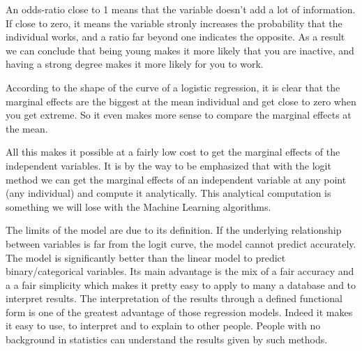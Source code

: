 






An odds-ratio close to 1 means that the variable doesn’t add a lot of information. If close to zero, it means the variable stronly increases the probability that the individual works, and a ratio far beyond one indicates the opposite.
As a result we can conclude that being young makes it more likely that you are inactive, and having a strong degree makes it more likely for you to work.

According to the shape of the curve of a logistic regression, it is clear that the marginal effects are the biggest at the mean individual and get close to zero when you get extreme. So it even makes more sense to compare the marginal effects at the mean.

All this makes it possible at a fairly low cost to get the marginal effects of the independent variables. It is by the way to be emphasized that with the logit method we can get the marginal effects of an independent variable at any point (any individual) and compute it analytically.
This analytical computation is something we will lose with the Machine Learning algorithms.

The limits of the model are due to its definition. If the underlying relationship between variables is far from the logit curve, the model cannot predict accurately. The model is significantly better than the linear model to predict binary/categorical variables.
Its main advantage is the mix of a fair accuracy and a a fair simplicity which makes it pretty easy to apply to many a database and to interpret results.
The interpretation of the results through a defined functional form is one of the greatest advantage of those regression models. Indeed it makes it easy to use, to interpret and to explain to other people. People with no background in statistics can understand the results given by such methods.
